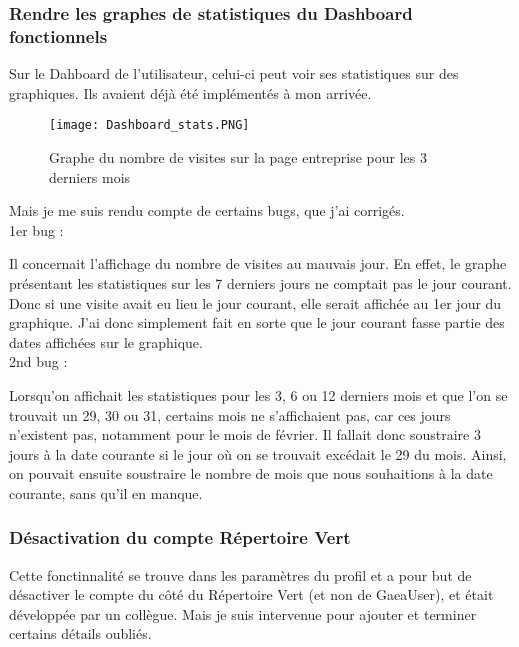 \subsubsection{Rendre les graphes de statistiques du Dashboard fonctionnels}

Sur le Dahboard de l'utilisateur, celui-ci peut voir ses statistiques sur des graphiques. 
Ils avaient déjà été implémentés à mon arrivée.

\begin{figure}[H]
    \texttt{[image: Dashboard\_stats.PNG]}
    \caption{Graphe du nombre de visites sur la page entreprise pour les 3 derniers mois}
\end{figure}

Mais je me suis rendu compte de certains bugs, que j'ai corrigés.\\

1er bug :

Il concernait l'affichage du nombre de visites au mauvais jour. En effet, le graphe présentant les statistiques sur les 7 derniers jours ne comptait pas le jour courant.
Donc si une visite avait eu lieu le jour courant, elle serait affichée au 1er jour du graphique. 
J'ai donc simplement fait en sorte que le jour courant fasse partie des dates affichées sur le graphique.\\

2nd bug :

Lorsqu'on affichait les statistiques pour les 3, 6 ou 12 derniers mois et que l'on se trouvait un 29, 30 ou 31, certains mois ne s'affichaient pas, car ces jours n'existent pas, notamment pour le mois de février.
Il fallait donc soustraire 3 jours à la date courante si le jour où on se trouvait excédait le 29 du mois.
Ainsi, on pouvait ensuite soustraire le nombre de mois que nous souhaitions à la date courante, sans qu'il en manque.

\subsubsection{Désactivation du compte Répertoire Vert}



Cette fonctinnalité se trouve dans les paramètres du profil et a pour but de désactiver le compte du côté du Répertoire Vert (et non de GaeaUser), et était développée par un collègue. 
Mais je suis intervenue pour ajouter et terminer certains détails oubliés.

